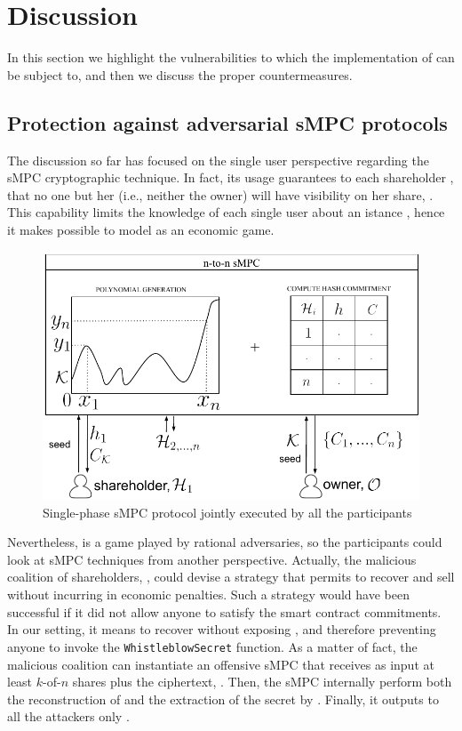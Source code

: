 \section{Discussion}\label{sect:impl_attacks}

In this section we highlight the vulnerabilities to which the implementation of \shortname can be subject to, and then we discuss the proper countermeasures.  

\subsection{Protection against adversarial sMPC protocols}\label{sect:impl_mpc}

The discussion so far has focused on the single user perspective regarding the sMPC cryptographic technique.
In fact, its usage guarantees to each shareholder \shareholder, that no one but her (i.e., neither the owner) will have visibility on her share, \share.
This capability limits the knowledge of each single user about an istance \shortname, hence it makes possible to model \shortname as an economic game. 

\begin{figure}[t]
	\centering
	\includegraphics[width=0.9\columnwidth]{fig/mpc_rev_1.pdf}
	\caption{Single-phase sMPC protocol jointly executed by all the participants}
	\label{fig:mpc1}
\end{figure}

Nevertheless, \shortname is a game played by rational adversaries, so the participants could look at sMPC techniques from another perspective.
Actually, the malicious coalition of shareholders, \coalition, could devise a strategy that permits to recover and sell \secret without incurring in economic penalties. 
Such a strategy would have been successful if it did not allow anyone to satisfy the smart contract commitments.
In our setting, it means to recover \secret without exposing \key, and therefore preventing anyone to invoke the \texttt{WhistleblowSecret} function.
As a matter of fact, the malicious coalition can instantiate an offensive sMPC that receives as input at least $k$-of-$n$ shares plus the ciphertext, \ciphertext.
Then, the sMPC internally perform both the reconstruction of \key and the extraction of the secret by \unwrap.
Finally, it outputs to all the attackers only \secret. 

